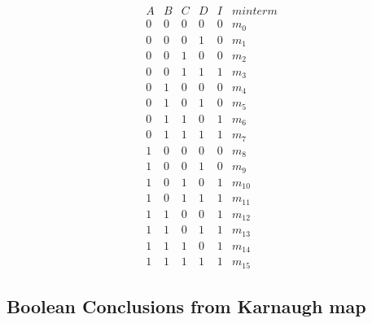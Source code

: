 \documentclass[11pt]{article}
\begin{document}
 \begin{displaymath}
 \begin{array}{cccc|c|c}
 A & B & C & D & I & minterm\\
 \hline
 0 & 0 & 0 & 0 & 0 & m_0 \\
 0 & 0 & 0 & 1 & 0 & m_1\\
 0 & 0 & 1 & 0 & 0 & m_2\\
 0 & 0 & 1 & 1 & 1 & m_3\\
 0 & 1 & 0 & 0 & 0 & m_4\\
 0 & 1 & 0 & 1 & 0 & m_5\\
 0 & 1 & 1 & 0 & 1 & m_6\\
 0 & 1 & 1 & 1 & 1 & m_7\\
 1 & 0 & 0 & 0 & 0 & m_8\\
 1 & 0 & 0 & 1 & 0 & m_9\\
 1 & 0 & 1 & 0 & 1 & m_{10}\\
 1 & 0 & 1 & 1 & 1 & m_{11}\\
 1 & 1 & 0 & 0 & 1 & m_{12}\\
 1 & 1 & 0 & 1 & 1 & m_{13}\\
 1 & 1 & 1 & 0 & 1 & m_{14}\\
 1 & 1 & 1 & 1 & 1 & m_{15}
 \end{array}
 \end{displaymath}



 \begin{karnaugh-map}[4][4][1][$D$][$C$][$B$][$A$]

 \end{karnaugh-map}
\newpage
\subsection{Boolean Conclusions from Karnaugh map}
\end{document}
